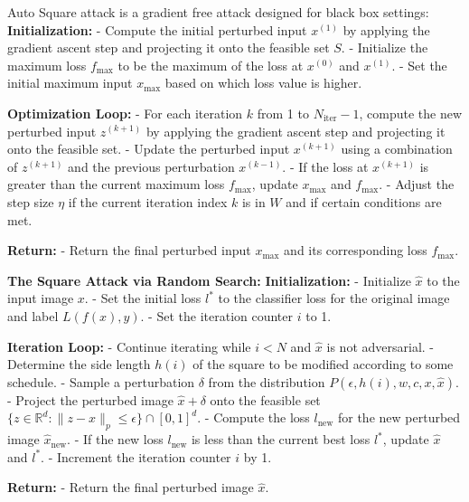Auto Square attack is a gradient free attack designed for black box settings:
\textbf{Initialization:}
- Compute the initial perturbed input $x^{(1)}$ by applying the gradient ascent step and projecting it onto the feasible set $S$.
- Initialize the maximum loss $f_{\text{max}}$ to be the maximum of the loss at $x^{(0)}$ and $x^{(1)}$.
- Set the initial maximum input $x_{\text{max}}$ based on which loss value is higher.

\textbf{Optimization Loop:}
- For each iteration $k$ from 1 to $N_{\text{iter}} - 1$, compute the new perturbed input $z^{(k+1)}$ by applying the gradient ascent step and projecting it onto the feasible set.
- Update the perturbed input $x^{(k+1)}$ using a combination of $z^{(k+1)}$ and the previous perturbation $x^{(k-1)}$.
- If the loss at $x^{(k+1)}$ is greater than the current maximum loss $f_{\text{max}}$, update $x_{\text{max}}$ and $f_{\text{max}}$.
- Adjust the step size $\eta$ if the current iteration index $k$ is in $W$ and if certain conditions are met.

\textbf{Return:}
- Return the final perturbed input $x_{\text{max}}$ and its corresponding loss $f_{\text{max}}$.

\textbf{The Square Attack via Random Search:}
\textbf{Initialization:}
- Initialize $\hat{x}$ to the input image $x$.
- Set the initial loss $l^*$ to the classifier loss for the original image and label $L(f(x), y)$.
- Set the iteration counter $i$ to 1.

\textbf{Iteration Loop:}
- Continue iterating while $i < N$ and $\hat{x}$ is not adversarial.
- Determine the side length $h(i)$ of the square to be modified according to some schedule.
- Sample a perturbation $\delta$ from the distribution $P(\epsilon, h(i), w, c, x, \hat{x})$.
- Project the perturbed image $\hat{x} + \delta$ onto the feasible set $\{z \in \mathbb{R}^d : \|z - x\|_p \leq \epsilon\} \cap [0, 1]^d$.
- Compute the loss $l_{\text{new}}$ for the new perturbed image $\hat{x}_{\text{new}}$.
- If the new loss $l_{\text{new}}$ is less than the current best loss $l^*$, update $\hat{x}$ and $l^*$.
- Increment the iteration counter $i$ by 1.

\textbf{Return:}
- Return the final perturbed image $\hat{x}$.